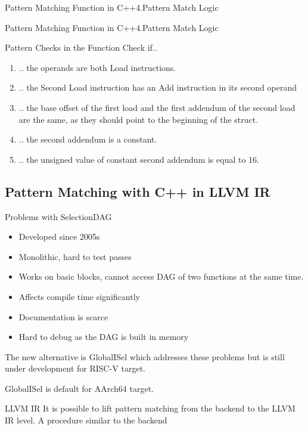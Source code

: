 \begin{frame}[fragile]{Pattern Matching Function in C++}{4.Pattern Match Logic}

\end{frame}

\begin{frame}[fragile]{Pattern Matching Function in C++}{4.Pattern Match Logic}

\end{frame}

\begin{frame}{Pattern Checks in the Function}
Check if..
\begin{enumerate}
    \item .. the operands are both Load instructions.
    \item .. the Second Load instruction has an Add instruction in its second operand
    \item .. the base offset of the first load and the first addendum of the second load are the same, as they should point to the beginning of the struct.
    \item .. the second addendum is a constant.
    \item .. the unsigned value of constant second addendum is equal to 16.
\end{enumerate}
\end{frame}

\subsection{Pattern Matching with C++ in LLVM IR}
\begin{frame}{Problems with SelectionDAG}
    \begin{itemize}
        \item Developed since 2005s
        \item Monolithic, hard to test passes
        \item Works on basic blocks, cannot access DAG of two functions at the same time.
        \item Affects compile time significantly
        \item Documentation is scarce
        \item Hard to debug as the DAG is built in memory
    \end{itemize}
    The new alternative is GlobalISel which addresses these problems but is still under development for RISC-V target.

    GlobalISel is default for AArch64 target.
\end{frame}

\begin{frame}{LLVM IR}
It is possible to lift pattern matching from the backend to the LLVM IR level. A procedure similar to the backend 
\end{frame}
